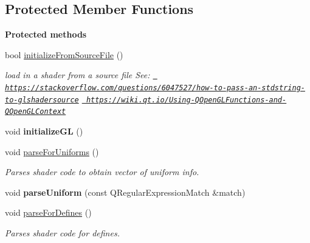 \subsection*{Protected Member Functions}
\begin{Indent}\textbf{ Protected methods}\par
\begin{DoxyCompactItemize}
\item 
\mbox{\label{classrev_1_1_shader_affede9daadf9cef6b6be41e4095ef805}} 
bool \mbox{\hyperlink{classrev_1_1_shader_affede9daadf9cef6b6be41e4095ef805}{initialize\+From\+Source\+File}} ()
\begin{DoxyCompactList}\small\item\em load in a shader from a source file See\+: \href{https://stackoverflow.com/questions/6047527/how-to-pass-an-stdstring-to-glshadersource}{\texttt{ https\+://stackoverflow.\+com/questions/6047527/how-\/to-\/pass-\/an-\/stdstring-\/to-\/glshadersource}} \href{https://wiki.qt.io/Using-QOpenGLFunctions-and-QOpenGLContext}{\texttt{ https\+://wiki.\+qt.\+io/\+Using-\/\+Q\+Open\+G\+L\+Functions-\/and-\/\+Q\+Open\+G\+L\+Context}} \end{DoxyCompactList}\item 
\mbox{\label{classrev_1_1_shader_a91768139ca83bb23457025402251f42e}} 
void {\bfseries initialize\+GL} ()
\item 
\mbox{\label{classrev_1_1_shader_ad97e99433d46a33a0e90dae51cd23c62}} 
void \mbox{\hyperlink{classrev_1_1_shader_ad97e99433d46a33a0e90dae51cd23c62}{parse\+For\+Uniforms}} ()
\begin{DoxyCompactList}\small\item\em Parses shader code to obtain vector of uniform info. \end{DoxyCompactList}\item 
\mbox{\label{classrev_1_1_shader_a8a937c79f34113fd9462ffd0429e9b71}} 
void {\bfseries parse\+Uniform} (const Q\+Regular\+Expression\+Match \&match)
\item 
\mbox{\label{classrev_1_1_shader_a450a7709c20abe122cf34d14b2864aac}} 
void \mbox{\hyperlink{classrev_1_1_shader_a450a7709c20abe122cf34d14b2864aac}{parse\+For\+Defines}} ()
\begin{DoxyCompactList}\small\item\em Parses shader code for defines. \end{DoxyCompactList}\item 

\end{DoxyCompactItemize}
\end{Indent}
